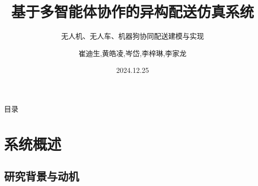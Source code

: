 \documentclass[
10pt,
aspectratio=169,
]{beamer}
\title{基于多智能体协作的异构配送仿真系统}
\subtitle{无人机、无人车、机器狗协同配送建模与实现}
\author[崔迪生,黄皓凌,岑岱,李梓琳,李家龙]
{崔迪生,黄皓凌,岑岱,李梓琳,李家龙}
\institute[中山大学]{中山大学\\
系统科学与工程学院\\
指导老师：李雄
}
\date{2024.12.25}
\begin{document}
\maketitle

\begin{frame}
    {目录}
    \begin{multicols}{2}
        \tableofcontents
        \end{multicols}
\end{frame}






\section{系统概述}

\subsection{研究背景与动机}
\end{document}
